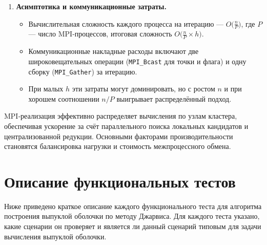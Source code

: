 \documentclass[12pt,a4paper]{article}
\begin{document}
\begin{enumerate}
  \item \textbf{Асимптотика и коммуникационные затраты.}  
    \begin{itemize}
      \item Вычислительная сложность каждого процесса на итерацию — \(O\bigl(\tfrac{n}{P}\bigr)\), где \(P\) — число MPI‑процессов, итоговая сложность \(O\bigl(\tfrac{n}{P}\times h\bigr)\).  
      \item Коммуникационные накладные расходы включают две широковещательных операции (\texttt{MPI\_Bcast} для точки и флага) и одну сборку (\texttt{MPI\_Gather}) за итерацию.  
      \item При малых \(h\) эти затраты могут доминировать, но с ростом \(n\) и при хорошем соотношении \(n/P\) выигрывает распределённый подход.
    \end{itemize}
\end{enumerate}

MPI‑реализация эффективно распределяет вычисления по узлам кластера, обеспечивая ускорение за счёт параллельного поиска локальных кандидатов и централизованной редукции. Основными факторами производительности становятся балансировка нагрузки и стоимость межпроцессного обмена.

\section{Описание функциональных тестов}

Ниже приведено краткое описание каждого функционального теста для алгоритма построения выпуклой оболочки по методу Джарвиса. Для каждого теста указано, какие сценарии он проверяет и является ли данный сценарий типовым для задачи вычисления выпуклой оболочки.
\end{document}
